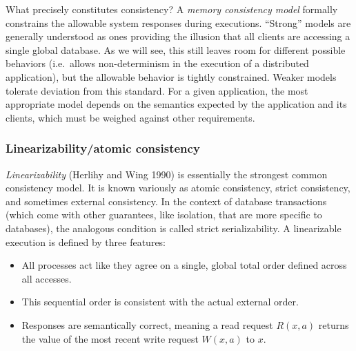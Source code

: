 \documentclass[]             %
{NASA}                       %
\theoremstyle{definition}
\providecommand{\tightlist}{%
  \setlength{\itemsep}{0pt}\setlength{\parskip}{0pt}}
\begin{document}
What precisely constitutes consistency? A \emph{memory consistency
model} formally constrains the allowable system responses during
executions. ``Strong'' models are generally understood as ones
providing the illusion that all clients are accessing a single global
database. As we will see, this still leaves room for different
possible behaviors (i.e.~allows non-determinism in the execution of a
distributed application), but the allowable behavior is tightly
constrained.  Weaker models tolerate deviation from this standard. For
a given application, the most appropriate model depends on the
semantics expected by the application and its clients, which must be
weighed against other requirements.

\subsubsection{Linearizability/atomic consistency}
\label{sssec:linearizability}

\emph{Linearizability} (Herlihy and Wing 1990) is essentially the
strongest common consistency model. It is known variously as atomic
consistency, strict consistency, and sometimes external consistency. In
the context of database transactions (which come with other guarantees,
like isolation, that are more specific to databases), the analogous
condition is called strict serializability. A linearizable execution is
defined by three features:

\begin{itemize}
  \tightlist
\item
  All processes act like they agree on a single, global total order
  defined across all accesses.
\item
  This sequential order is consistent with the actual external order.
\item
  Responses are semantically correct, meaning a read request \(R(x, a)\)
  returns the value of the most recent write request \(W(x, a)\) to
  \(x\).
\end{itemize}
\end{document}
